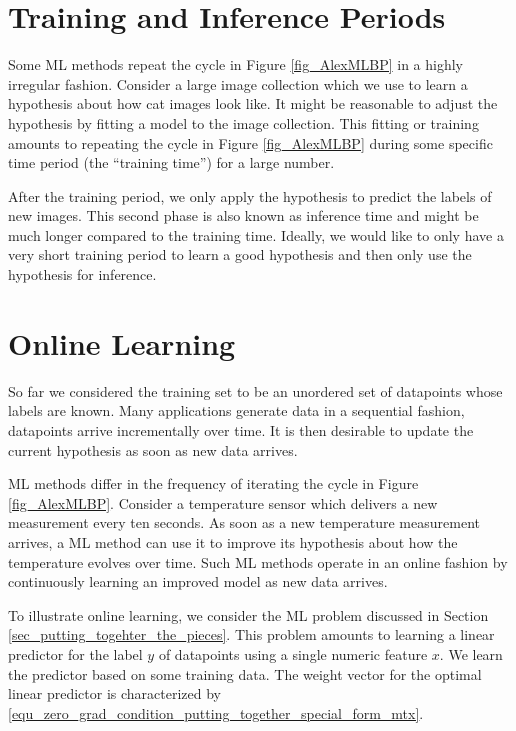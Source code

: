 \documentclass[12pt]{report}
\begin{document}
\section{Training and Inference Periods} 
\label{sec_training_inference} 

Some ML methods repeat the cycle in Figure \ref{fig_AlexMLBP} in a 
highly irregular fashion. Consider a large image collection which we 
use to learn a hypothesis about how cat images look like. It might 
be reasonable to adjust the hypothesis by fitting a model to the image 
collection. This fitting or training amounts to repeating the 
cycle in Figure \ref{fig_AlexMLBP} during some specific time period 
(the ``training time'') for a large number. 

After the training period, we only apply the hypothesis to predict 
the labels of new images. This second phase is also known 
as inference time and might be much longer compared to the 
training time. Ideally, we would like to only have a very short 
training period to learn a good hypothesis and then only use 
the hypothesis for inference. 

\section{Online Learning} 
\label{sec_online_learning}

So far we considered the training set to be an unordered set of datapoints 
whose labels are known. Many applications generate data in a sequential 
fashion, datapoints arrive incrementally over time. It is then desirable to update 
the current hypothesis as soon as new data arrives. 

ML methods differ in the frequency of iterating the cycle in Figure \ref{fig_AlexMLBP}. Consider a 
temperature sensor which delivers a new measurement every ten seconds. As soon as a new 
temperature measurement arrives, a ML method can use it to improve its hypothesis about 
how the temperature evolves over time. Such ML methods operate in an online fashion by 
continuously learning an improved model as new data arrives.  

To illustrate online learning, we consider the ML problem discussed in Section \ref{sec_putting_togehter_the_pieces}. 
This problem amounts to learning a linear predictor for the label $y$ of datapoints 
using a single numeric feature $x$. We learn the predictor based on some training 
data. The weight vector for the optimal linear predictor is characterized by \eqref{equ_zero_grad_condition_putting_together_special_form_mtx}. 
\end{document}
